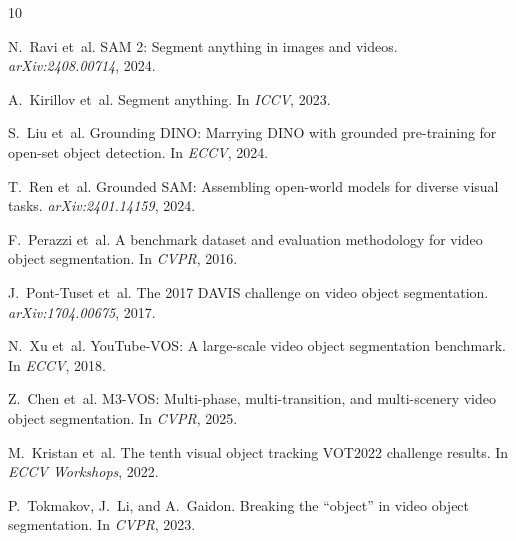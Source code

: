 \documentclass[11pt,a4paper]{article}
\begin{document}
\footnotesize
\setlength{\bibsep}{0pt}
\begin{thebibliography}{10}

N.~Ravi et~al. SAM 2: Segment anything in images and videos. \emph{arXiv:2408.00714}, 2024.

A.~Kirillov et~al. Segment anything. In \emph{ICCV}, 2023.

S.~Liu et~al. Grounding DINO: Marrying DINO with grounded pre-training for open-set object detection. In \emph{ECCV}, 2024.

T.~Ren et~al. Grounded SAM: Assembling open-world models for diverse visual tasks. \emph{arXiv:2401.14159}, 2024.

F.~Perazzi et~al. A benchmark dataset and evaluation methodology for video object segmentation. In \emph{CVPR}, 2016.

J.~Pont-Tuset et~al. The 2017 DAVIS challenge on video object segmentation. \emph{arXiv:1704.00675}, 2017.

N.~Xu et~al. YouTube-VOS: A large-scale video object segmentation benchmark. In \emph{ECCV}, 2018.

Z.~Chen et~al. M3-VOS: Multi-phase, multi-transition, and multi-scenery video object segmentation. In \emph{CVPR}, 2025.

M.~Kristan et~al. The tenth visual object tracking VOT2022 challenge results. In \emph{ECCV Workshops}, 2022.

P.~Tokmakov, J.~Li, and A.~Gaidon. Breaking the ``object'' in video object segmentation. In \emph{CVPR}, 2023.

\end{thebibliography}
\end{document}
